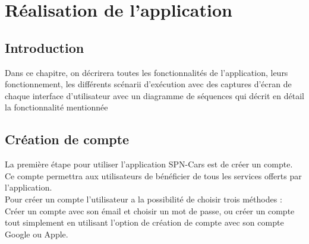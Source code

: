 \chapter{Réalisation de l'application}
\minitoc
\clearpage
\section*{Introduction} Dans ce chapitre, on décrirera toutes les fonctionnalités de l'application, leurs fonctionnement, les différents scénarii d'exécution avec des captures d'écran de chaque interface d'utilisateur avec un diagramme de séquences qui décrit en détail la fonctionnalité mentionnée
\justifying
\section{Création de compte}
La première étape pour utiliser l'application SPN-Cars est de créer un compte. Ce compte permettra aux utilisateurs de bénéficier de tous les services offerts par l'application.\\
\noindent Pour créer un compte l'utilisateur a la possibilité de choisir trois méthodes : Créer un compte avec son émail et choisir un mot de passe, ou créer un compte tout simplement en utilisant l'option de création de compte avec son compte Google ou Apple.
